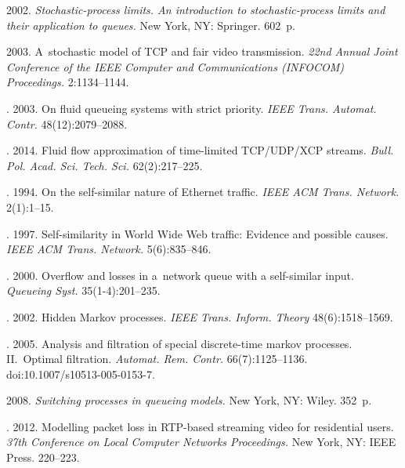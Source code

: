 \begin{multicols}{2}
{{\begin{thebibliography}{99}
 2002. \textit{Stochastic-process limits. An 
introduction to stochastic-process limits and their application to queues.} 
New York, NY: Springer. 602~p.

 2003. A~stochastic model of TCP and fair video transmission. 
\textit{22nd Annual Joint Conference of the IEEE Computer and Communications 
(INFOCOM) Proceedings.} 2:1134--1144.



. 2003.
On fluid queueing systems with strict priority. 
\textit{IEEE Trans. Automat. Contr.} 48(12):2079--2088.

. 2014.
Fluid flow approximation of time-limited TCP/UDP/XCP streams. 
\textit{Bull. Pol. Acad. Sci. Tech. Sci.} 62(2):217--225.

. 1994. 
On the self-similar nature of Ethernet traffic. 
\textit{IEEE ACM Trans. Network.} 2(1):1--15.

. 1997. 
Self-similarity in World Wide Web traffic: Evidence and possible causes. 
\textit{IEEE ACM Trans. Network.} 5(6):835--846.

\pagebreak

. 2000. 
Overflow and losses in a~network queue with a self-similar input. 
\textit{Queueing Syst.} 35(1-4):201--235.

. 2002. Hidden Markov processes. 
\textit{IEEE Trans. Inform. Theory} 48(6):1518--1569.

. 2005. 
Analysis and filtration of special discrete-time markov processes. 
II.~Optimal filtration. \textit{Automat. Rem. Contr.} 66(7):1125--1136.
{doi:10.1007/s10513-005-0153-7.}

 2008. 
\textit{Switching processes in queueing models.} New York, NY: Wiley. 352~p.

. 2012. 
Modelling packet loss in RTP-based streaming video for residential users. 
\textit{37th Conference on Local Computer Networks Proceedings.} 
New York, NY: IEEE Press. 220--223.




\end{thebibliography}}}
\end{multicols}
